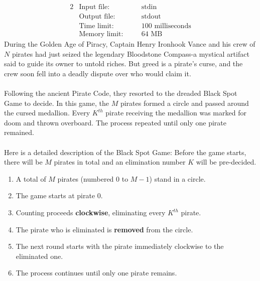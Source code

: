 \documentclass[12pt,a4paper]{article}
\begin{document}
\begin{alignat*} {2}
 &   \text{Input file:}   \quad     &&\text{stdin}\\
 &   \text{Output file:}  \quad     &&\text{stdout}\\
 &   \text{Time limit:}   \quad     &&\text{100 milliseconds}\\
 &   \text{Memory limit:} \quad     &&\text{64 MB}
\end{alignat*}
\noindent
During the Golden Age of Piracy, Captain Henry Ironhook Vance and his crew of \(N\) pirates had just seized the legendary Bloodstone Compass-a mystical artifact said to guide its owner to untold riches. 
But greed is a pirate's curse, and the crew soon fell into a deadly dispute over who would claim it.\\
\noindent\\
Following the ancient Pirate Code, they resorted to the dreaded Black Spot Game to decide. 
In this game, the $M$ pirates formed a circle and passed around the cursed medallion. Every $K^{th}$ pirate receiving the medallion was marked for doom and thrown overboard.
The process repeated until only one pirate remained.\\
\noindent\\
Here is a detailed description of the Black Spot Game:
Before the game starts, there will be \(M\) pirates in total and an elimination number \(K\) will be pre-decided.
\begin{enumerate}
    \setlength{\itemsep}{-3pt} %
    \item A total of \(M\) pirates (numbered 0 to \(M-1\)) stand in a circle.
    \item The game starts at pirate 0.
    \item Counting proceeds \textbf{clockwise}, eliminating every \(K^{th}\) pirate.
    \item The pirate who is eliminated is \textbf{removed} from the circle.
    \item The next round starts with the pirate immediately clockwise to the eliminated one.
    \item The process continues until only one pirate remains.
\end{enumerate}
\end{document}
